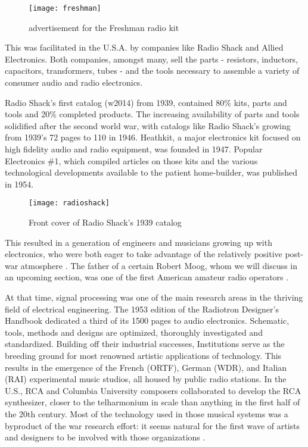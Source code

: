 	\begin{figure}[h!]
	  \caption{advertisement for the Freshman radio kit}
	  \centering
	    \texttt{[image: freshman]}
	\end{figure}

This was facilitated in the U.S.A. by companies like Radio Shack and Allied Electronics. Both companies, amongst many, sell the parts - resistors, inductors, capacitors, transformers, tubes - and the tools necessary to assemble a variety of consumer audio and radio electronics. 

Radio Shack’s first catalog (w2014) from 1939, contained 80\% kits, parts and tools and 20\% completed products. The increasing availability of parts and tools solidified after the second world war, with catalogs like Radio Shack’s growing from 1939’s 72 pages to 110 in 1946. Heathkit, a major electronics kit focused on high fidelity audio and radio equipment, was founded in 1947. Popular Electronics \#1, which compiled articles on those kits and the various technological developments available to the patient home-builder, was published in 1954. 

	\begin{figure}[h!]
	  \caption{Front cover of Radio Shack's 1939 catalog}
	  \centering
	    \texttt{[image: radioshack]}
	\end{figure}

This resulted in a generation of engineers and musicians growing up with electronics, who were both eager to take advantage of the relatively positive post-war atmosphere \citep{holmes2002}. The father of a certain Robert Moog, whom we will discuss in an upcoming section, was one of the first American amateur radio operators \cite[p.12]{pinch2002}. 

At that time, signal processing was one of the main research areas in the thriving field of electrical engineering. The 1953 edition of the Radiotron Designer's Handbook \citep{langford1953} dedicated a third of its 1500 pages to audio electronics. Schematic, tools, methods and designs are optimized, thoroughly investigated and standardized. Building off their industrial successes, Institutions serve as the breeding ground for most renowned artistic applications of technology. This results in the emergence of the French (ORTF), German (WDR), and Italian (RAI) experimental music studios, all housed by public radio stations. In the U.S., RCA and Columbia University composers collaborated to develop the RCA synthesizer, closer to the telharmonium in scale than anything in the first half of the 20th century. Most of the technology used in those musical systems was a byproduct of the war research effort: it seems natural for the first wave of artists and designers to be involved with those organizations \cite[p.81]{holmes2002}. 

